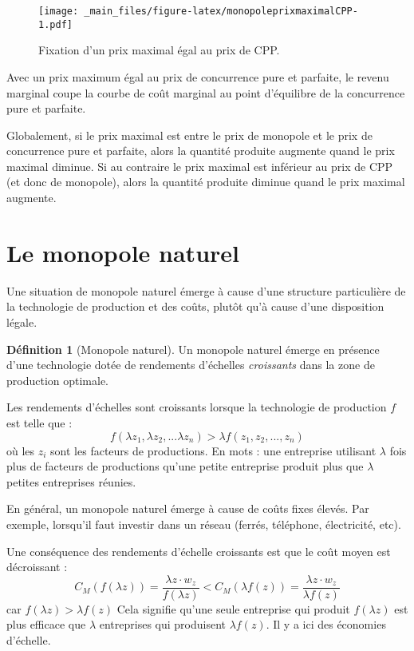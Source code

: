 \documentclass[
]{book}
\theoremstyle{definition}
\newtheorem{definition}{Définition}[chapter]
\theoremstyle{definition}
\theoremstyle{definition}
\theoremstyle{definition}
\theoremstyle{remark}
\begin{document}
\begin{figure}
\centering
\texttt{[image: \_main\_files/figure-latex/monopoleprixmaximalCPP-1.pdf]}
\caption{\label{fig:monopoleprixmaximalCPP}Fixation d'un prix maximal égal au prix de CPP.}
\end{figure}

Avec un prix maximum égal au prix de concurrence pure et parfaite, le revenu marginal coupe la courbe de coût marginal au point d'équilibre de la concurrence pure et parfaite.

Globalement, si le prix maximal est entre le prix de monopole et le prix de concurrence pure et parfaite, alors la quantité produite augmente quand le prix maximal diminue.
Si au contraire le prix maximal est inférieur au prix de CPP (et donc de monopole), alors la quantité produite diminue quand le prix maximal augmente.

\hypertarget{le-monopole-naturel}{%
\section{Le monopole naturel}\label{le-monopole-naturel}}

Une situation de monopole naturel émerge à cause d'une structure particulière de la technologie de production et des coûts, plutôt qu'à cause d'une disposition légale.

\begin{definition}[Monopole naturel]
Un monopole naturel émerge en présence d'une technologie dotée de rendements d'échelles \emph{croissants} dans la zone de production optimale.
\end{definition}

Les rendements d'échelles sont croissants lorsque la technologie de production \(f\) est telle que :
\[
f(\lambda z_1, \lambda z_2, ...\lambda z_n) > \lambda f(z_1,z_2, ..., z_n)
\]
où les \(z_i\) sont les facteurs de productions.
En mots : une entreprise utilisant \(\lambda\) fois plus de facteurs de productions qu'une petite entreprise produit plus que \(\lambda\) petites entreprises réunies.

En général, un monopole naturel émerge à cause de coûts fixes élevés.
Par exemple, lorsqu'il faut investir dans un réseau (ferrés, téléphone, électricité, etc).

Une conséquence des rendements d'échelle croissants est que le coût moyen est décroissant :
\[
C_M(f(\lambda z)) =\frac{\lambda z\cdot w_z}{f(\lambda z)} < C_M(\lambda f(z)) = \frac{\lambda z\cdot w_z}{\lambda f(z)}
\]
car \(f(\lambda z)>\lambda f(z)\)
Cela signifie qu'une seule entreprise qui produit \(f(\lambda z)\) est plus efficace que \(\lambda\) entreprises qui produisent \(\lambda f(z)\).
Il y a ici des économies d'échelle.
\end{document}
